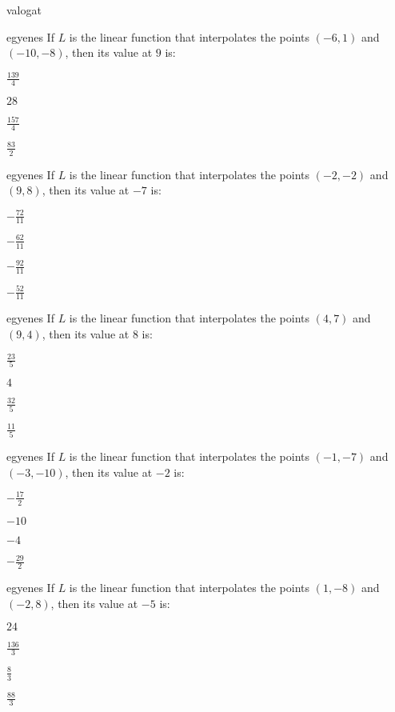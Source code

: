 \documentclass[12pt]{article}
\begin{document}
\begin{quiz}{valogat}
\begin{multi}{egyenes}
If $L$ is the linear function that interpolates the points
$(-6,1)$ and $(-10,-8)$, then its value at $9$ is:
\item* $ \frac{139}{4} $
\item  $ 28 $
\item  $ \frac{157}{4} $
\item  $ \frac{83}{2} $
\end{multi}
\begin{multi}{egyenes}
If $L$ is the linear function that interpolates the points
$(-2,-2)$ and $(9,8)$, then its value at $-7$ is:
\item* $ -\frac{72}{11} $
\item  $ -\frac{62}{11} $
\item  $ -\frac{92}{11} $
\item  $ -\frac{52}{11} $
\end{multi}
\begin{multi}{egyenes}
If $L$ is the linear function that interpolates the points
$(4,7)$ and $(9,4)$, then its value at $8$ is:
\item* $ \frac{23}{5} $
\item  $ 4 $
\item  $ \frac{32}{5} $
\item  $ \frac{11}{5} $
\end{multi}
\begin{multi}{egyenes}
If $L$ is the linear function that interpolates the points
$(-1,-7)$ and $(-3,-10)$, then its value at $-2$ is:
\item* $ -\frac{17}{2} $
\item  $ -10 $
\item  $ -4 $
\item  $ -\frac{29}{2} $
\end{multi}
\begin{multi}{egyenes}
If $L$ is the linear function that interpolates the points
$(1,-8)$ and $(-2,8)$, then its value at $-5$ is:
\item* $ 24 $
\item  $ \frac{136}{3} $
\item  $ \frac{8}{3} $
\item  $ \frac{88}{3} $
\end{multi}
\end{quiz}
\end{document}
